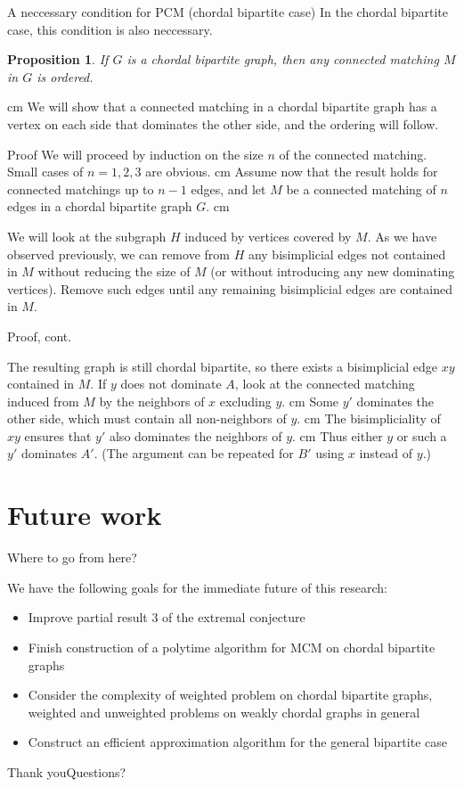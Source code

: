 \documentclass{beamer}
\newtheorem{prop}{Proposition}
\newcommand{\bframe}[2]{\begin{frame}{#1}#2\end{frame}}
\begin{document}
\bframe{A neccessary condition for PCM (chordal bipartite case)}{
In the chordal bipartite case, this condition is also neccessary.
\begin{prop}
	If $G$ is a chordal bipartite graph, then any connected matching $M$ in $G$ is ordered.
\end{prop}\pause\vskip 0.5 cm  
	We will show that a connected matching in a chordal bipartite graph has a vertex on each side that dominates the other side, and the ordering will follow.
}
\bframe{Proof}
{
 	We will proceed by induction on the size $n$ of the connected matching. \pause Small cases of $n = 1,2,3$ are obvious.  \pause \vskip 0.5 cm
	Assume now that the result holds for connected matchings up to $n-1$ edges, and let $M$ be a connected matching of $n$ edges in a chordal bipartite graph $G$.\pause \vskip 0.5 cm 

We will look at the subgraph $H$  induced by vertices covered by $M$.  \pause As we have observed previously, we can remove from $H$ any bisimplicial edges not contained in $M$ without reducing the size of $M$ \pause(or without introducing any new dominating vertices).  \pause  Remove such edges until any remaining bisimplicial edges are contained in $M$.
}

\bframe{Proof, cont.}{

The resulting graph is still chordal bipartite, so there exists a bisimplicial edge $xy$ contained in $M$. \pause If $y$ does not dominate $A$, look at the connected matching induced from $M$ by the neighbors of $x$ excluding $y$.  \pause \vskip 0.5 cm
Some $y'$ dominates the other side, which must contain all non-neighbors of $y$. \pause \vskip 0.5 cm The bisimpliciality of $xy$ ensures that $y'$ also dominates the neighbors of $y$.  \pause \vskip 0.5 cm Thus either $y$ or such a $y'$ dominates $A'$.  \pause (The argument can be repeated for $B'$ using $x$ instead of $y$.)  

}

\section{Future work}

\bframe{Where to go from here?}{

We have the following goals for the immediate future of this research:
\begin{itemize}\pause
	\item Improve partial result 3 of the extremal conjecture \pause
	\item Finish construction of a polytime algorithm for MCM on chordal bipartite graphs \pause
	\item Consider the complexity of weighted problem on chordal bipartite graphs, weighted and unweighted problems on weakly chordal graphs in general \pause
	\item Construct an efficient approximation algorithm for the general bipartite case 
\end{itemize}
}
\bframe{Thank you}{Questions?}
\end{document}

